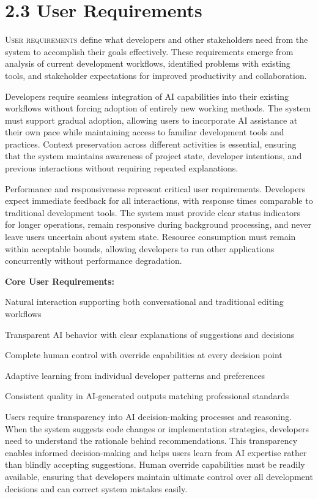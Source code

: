 \clearpage
\section{2.3 User Requirements}
\label{sec:user-requirements}

\lettrine{U}{ser requirements} define what developers and other stakeholders need from the system to accomplish their goals effectively. These requirements emerge from analysis of current development workflows, identified problems with existing tools, and stakeholder expectations for improved productivity and collaboration.

Developers require seamless integration of AI capabilities into their existing workflows without forcing adoption of entirely new working methods. The system must support gradual adoption, allowing users to incorporate AI assistance at their own pace while maintaining access to familiar development tools and practices. Context preservation across different activities is essential, ensuring that the system maintains awareness of project state, developer intentions, and previous interactions without requiring repeated explanations.

Performance and responsiveness represent critical user requirements. Developers expect immediate feedback for all interactions, with response times comparable to traditional development tools. The system must provide clear status indicators for longer operations, remain responsive during background processing, and never leave users uncertain about system state. Resource consumption must remain within acceptable bounds, allowing developers to run other applications concurrently without performance degradation.

\textbf{Core User Requirements:}
\begin{compactlist}
    \item Natural interaction supporting both conversational and traditional editing workflows
    \item Transparent AI behavior with clear explanations of suggestions and decisions
    \item Complete human control with override capabilities at every decision point
    \item Adaptive learning from individual developer patterns and preferences
    \item Consistent quality in AI-generated outputs matching professional standards
\end{compactlist}

Users require transparency into AI decision-making processes and reasoning. When the system suggests code changes or implementation strategies, developers need to understand the rationale behind recommendations. This transparency enables informed decision-making and helps users learn from AI expertise rather than blindly accepting suggestions. Human override capabilities must be readily available, ensuring that developers maintain ultimate control over all development decisions and can correct system mistakes easily.
